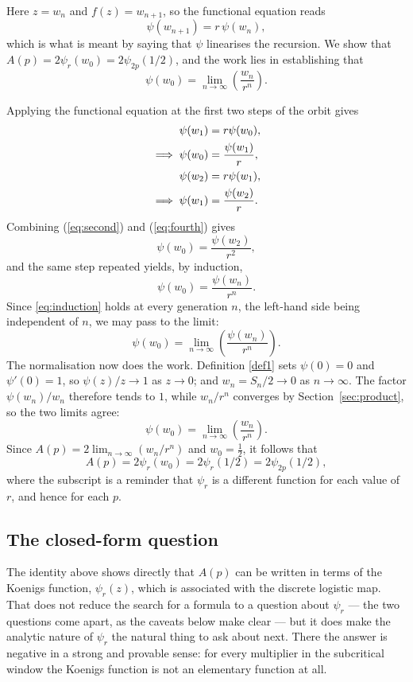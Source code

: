 Here $z=w_n$ and $f(z)=w_{n+1}$, so the functional equation reads
\[
\psi(w_{n+1}) = r\,\psi(w_n),
\]
which is what is meant by saying that $\psi$ linearises the recursion. We show that
$A(p) = 2\psi_r(w_0) = 2\psi_{2p}(1/2)$, and the work lies in establishing that
\[
\psi(w_0) = \lim_{n\to\infty}\left(\frac{w_n}{r^n}\right).
\]

\vspace{10pt}
\noindent
Applying the functional equation at the first two steps of the orbit gives
\begin{align}
\psi(w_1) &= r\psi(w_0), \notag\\
\implies \psi(w_0) &= \frac{\psi(w_1)}{r}, \label{eq:second} \\
\psi(w_2) &= r\psi(w_1), \notag\\
\implies \psi(w_1) &= \frac{\psi(w_2)}{r}. \label{eq:fourth}
\end{align}
Combining (\ref{eq:second}) and (\ref{eq:fourth}) gives
$$\psi(w_0) = \frac{\psi(w_2)}{r^2},$$
and the same step repeated yields, by induction,
\begin{equation}
\psi(w_0) = \frac{\psi(w_n)}{r^n} .
\label{eq:induction}
\end{equation}
Since \eqref{eq:induction} holds at every generation $n$, the left-hand side being independent of $n$, we may pass to the limit:
$$\psi(w_0) = \lim_{n\to\infty}\left(\frac{\psi(w_n)}{r^n}\right).$$
The normalisation now does the work. Definition \ref{def1} sets $\psi(0)=0$ and $\psi'(0)=1$, so $\psi(z)/z\to1$ as $z\to0$; and $w_n=S_n/2\to0$ as $n\to\infty$. The factor $\psi(w_n)/w_n$ therefore tends to $1$, while $w_n/r^n$ converges by Section~\ref{sec:product}, so the two limits agree:
$$\psi(w_0) = \lim_{n\to\infty}\left(\frac{w_n}{r^n}\right).$$
Since $A(p) = 2\lim_{n\to\infty}(w_n/r^n)$ and $w_0=\tfrac12$, it follows that
\[
A(p) = 2\psi_r(w_0) = 2\psi_r(1/2) = 2\psi_{2p}(1/2),
\]
where the subscript is a reminder that $\psi_r$ is a different function for each value of $r$, and hence for each $p$.

\subsection{The closed-form question}
\label{sec:closedform}

The identity above shows directly that $A(p)$ can be written in terms of the Koenigs function, $\psi_r(z)$, which is associated with the discrete logistic map. That does not reduce the search for a formula to a question about $\psi_r$ --- the two questions come apart, as the caveats below make clear --- but it does make the analytic nature of $\psi_r$ the natural thing to ask about next. There the answer is negative in a strong and provable sense: for every multiplier in the subcritical window the Koenigs function is not an elementary function at all.


